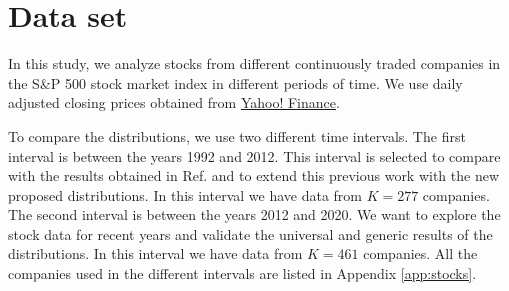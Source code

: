 \section{Data set}\label{sec:data_set}

In this study, we analyze stocks from different continuously traded companies
in the S\&P 500 stock market index in different periods of time. We use daily
adjusted closing prices obtained from
\href{https://finance.yahoo.com/}{Yahoo! Finance}.

To compare the distributions, we use two different time intervals. The first
interval is between the years 1992 and 2012. This interval is selected to
compare with the results obtained in Ref.  \cite{non_stationarity_fin_guhr}
and to extend this previous work with the new proposed distributions.
In this interval we have data from $K = 277$ companies. The second interval is
between the years 2012 and 2020. We want to explore the stock data for recent
years and validate the universal and generic results of the distributions. In
this interval we have data from $K = 461$ companies. All the companies used in
the different intervals are listed in Appendix \ref{app:stocks}.